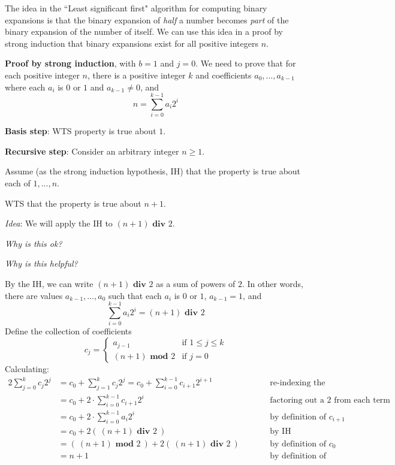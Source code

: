 \documentclass[12pt, oneside]{article}
\begin{document}
The idea in the ``Least significant first" algorithm 
for computing binary expansions is that the binary
expansion of {\it half} a number becomes {\it part} of the binary expansion of 
the number of itself. We can use this 
idea in a proof by strong induction that binary expansions exist for all 
positive integers $n$.


{\bf Proof by strong induction}, with $b=1$ and $j=0$. We need to prove
that for each positive integer $n$, there is 
a positive integer $k$ and coefficients $a_0, \ldots, a_{k-1}$ 
where each $a_i$ is $0$ or $1$ and $a_{k-1} \neq 0$, and 
\[
n = \sum_{i=0}^{k-1} a_i 2^i
\]



{\bf Basis step}:  WTS property is true about  $1$.

\phantom{Choose $a_0 = 1$, then $(a_0)_2 = 1 \cdot 2^0 = 1$.}
\vspace{80pt}


{\bf Recursive step}: Consider an arbitrary integer $n \geq 1$.

Assume (as the strong induction hypothesis, IH) that the property is true about  each of $1, \ldots, n$.  

WTS that the property is true about $n+1$.

{\it Idea}: We will apply the IH to $(n+1) \textbf{ div } 2$.

{\it Why is this ok?}


\vfill
\newpage
{\it Why is this helpful?}

By the IH, we can write $(n+1) \textbf{ div } 2$ as 
a sum of powers of $2$. In other words, 
there are values $a_{k-1}, \ldots, a_0$ such that each $a_i$ is $0$ or $1$, $a_{k-1} = 1$, 
and
\[
    \sum_{i=0}^{k-1} a_i 2^i = (n+1) \textbf{ div } 2   
\]
Define the collection of coefficients
\[
   c_{j} = 
   \begin{cases}
        a_{j-1} \qquad&\text{if $1 \leq j \leq k$}\\
        (n+1) \textbf{ mod } 2 &\text{if $j = 0$}
   \end{cases}
\]
Calculating: 
\begin{alignat*}{2}
    \sum_{j=0}^k c_j 2^j &= c_0 + \sum_{j=1}^k c_j 2^j 
    = c_0 + \sum_{i=0}^{k-1} c_{i+1} 2^{i+1} &\qquad &\text{re-indexing the summation}\\
    &= c_0 + 2 \cdot \sum_{i=0}^{k-1} c_{i+1}2^i &\qquad &\text{factoring out a $2$ from each term in the sum}\\
    &= c_0 + 2 \cdot \sum_{i=0}^{k-1} a_{i} 2^i &\qquad &\text{by definition of $c_{i+1}$}\\
    &= c_0 + 2 \left(~(n+1) \textbf{ div } 2 ~\right) &\qquad &\text{by IH} \\
    &= \left(~ (n+1) \textbf{ mod } 2 ~\right ) + 2 \left(~(n+1) \textbf{ div } 2 ~\right) &\qquad &\text{by definition of $c_0$} \\
    &= n+1 &\qquad&\text{by definition of long division}
\end{alignat*}
\end{document}

